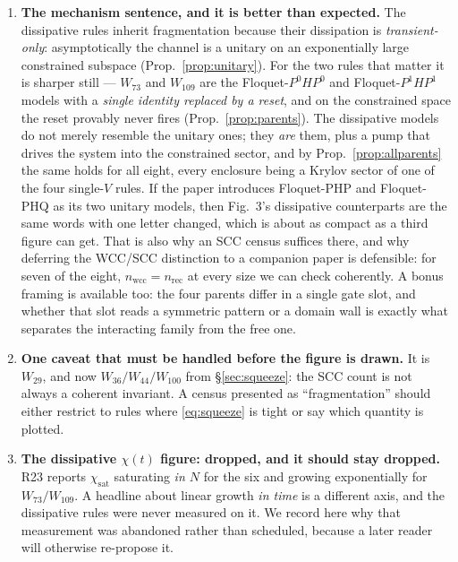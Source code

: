 \documentclass[11pt]{article}
\theoremstyle{plain}
\theoremstyle{remark}
\begin{document}
\begin{enumerate}
\item \textbf{The mechanism sentence, and it is better than expected.} The
dissipative rules inherit fragmentation because their dissipation is
\emph{transient-only}: asymptotically the channel is a unitary on an
exponentially large constrained subspace (Prop.~\ref{prop:unitary}). For the two
rules that matter it is sharper still --- $W_{73}$ and $W_{109}$ are the
Floquet-$P^0HP^0$ and Floquet-$P^1HP^1$ models with a \emph{single identity
replaced by a reset}, and on the constrained space the reset provably never
fires (Prop.~\ref{prop:parents}). The dissipative models do not merely resemble
the unitary ones; they \emph{are} them, plus a pump that drives the system into
the constrained sector, and by Prop.~\ref{prop:allparents} the same holds for
all eight, every enclosure being a Krylov sector of one of the four single-$V$
rules. If the paper introduces Floquet-PHP and Floquet-PHQ as its two unitary
models, then Fig.~3's dissipative counterparts are the same words with one
letter changed, which is about as compact as a third figure can get. That is
also why an SCC census suffices there, and why deferring the WCC/SCC distinction
to a companion paper is defensible: for seven of the eight, $n_{\mathrm{wcc}} =
n_{\mathrm{rec}}$ at every size we can check coherently. A bonus framing is
available too: the four parents differ in a single gate slot, and whether that
slot reads a symmetric pattern or a domain wall is exactly what separates the
interacting family from the free one.
\item \textbf{One caveat that must be handled before the figure is drawn.} It is
$W_{29}$, and now $W_{36}/W_{44}/W_{100}$ from \S\ref{sec:squeeze}: the SCC
count is not always a coherent invariant. A census presented as
``fragmentation'' should either restrict to rules where \eqref{eq:squeeze} is
tight or say which quantity is plotted.
\item \textbf{The dissipative $\chi(t)$ figure: dropped, and it should stay
dropped.} R23 reports $\chi_{\mathrm{sat}}$ saturating \emph{in $N$} for the six
and growing exponentially for $W_{73}/W_{109}$. A headline about linear growth
\emph{in time} is a different axis, and the dissipative rules were never
measured on it. We record here why that measurement was abandoned rather than
scheduled, because a later reader will otherwise re-propose it.


\end{enumerate}
\end{document}
